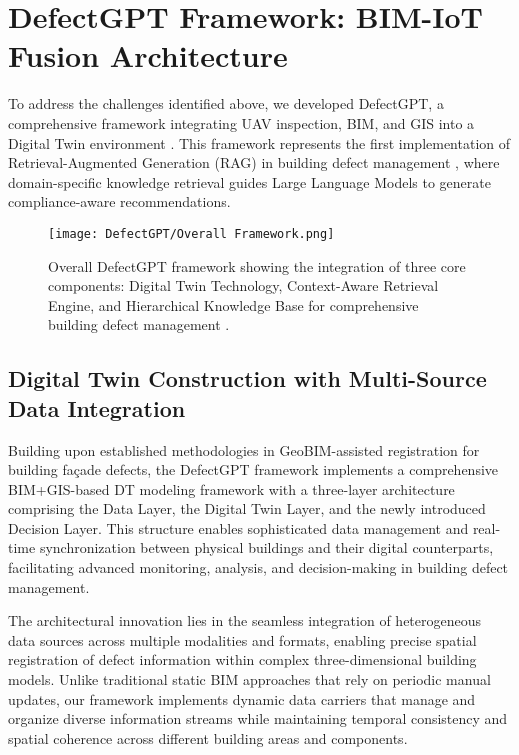 \section{DefectGPT Framework: BIM-IoT Fusion Architecture}

To address the challenges identified above, we developed DefectGPT, a comprehensive framework integrating UAV inspection, BIM, and GIS into a Digital Twin environment \cite{zhang2024automated}. This framework represents the first implementation of Retrieval-Augmented Generation (RAG) in building defect management \cite{lewis2020retrieval,fan2023retrieval}, where domain-specific knowledge retrieval guides Large Language Models to generate compliance-aware recommendations.

\begin{figure}[htbp]
    \centering
    \texttt{[image: DefectGPT/Overall Framework.png]}
    \caption{Overall DefectGPT framework showing the integration of three core components: Digital Twin Technology, Context-Aware Retrieval Engine, and Hierarchical Knowledge Base for comprehensive building defect management \cite{zhang2024automated}.}
    \label{fig:defectgpt-framework}
\end{figure}

\subsection{Digital Twin Construction with Multi-Source Data Integration}

Building upon established methodologies in GeoBIM-assisted registration for building façade defects, the DefectGPT framework implements a comprehensive BIM+GIS-based DT modeling framework with a three-layer architecture comprising the Data Layer, the Digital Twin Layer, and the newly introduced Decision Layer. This structure enables sophisticated data management and real-time synchronization between physical buildings and their digital counterparts, facilitating advanced monitoring, analysis, and decision-making in building defect management.

The architectural innovation lies in the seamless integration of heterogeneous data sources across multiple modalities and formats, enabling precise spatial registration of defect information within complex three-dimensional building models. Unlike traditional static BIM approaches that rely on periodic manual updates, our framework implements dynamic data carriers that manage and organize diverse information streams while maintaining temporal consistency and spatial coherence across different building areas and components.

